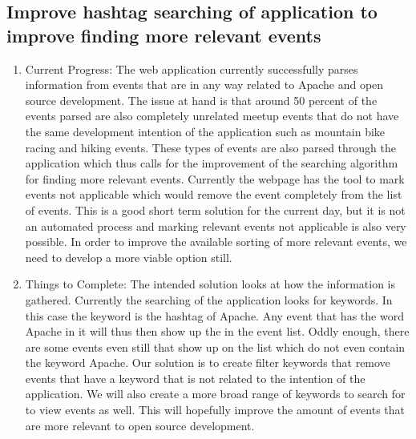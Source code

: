 \documentclass[letterpaper,10pt,onecolumn]{IEEEtran} %
\begin{document}
\subsection{Improve hashtag searching of application to improve finding more relevant events}
\begin{enumerate}[label*=\arabic*.]
\item Current Progress: The web application currently successfully parses information from events that are in any way related to Apache and open source development. The issue at hand is that around 50 percent of the events parsed are also completely unrelated meetup events that do not have the same development intention of the application such as mountain bike racing and hiking events. These types of events are also parsed through the application which thus calls for the improvement of the searching algorithm for finding more relevant events. Currently the webpage has the tool to mark events not applicable which would remove the event completely from the list of events. This is a good short term solution for the current day, but it is not an automated process and marking relevant events not applicable is also very possible. In order to improve the available sorting of more relevant events, we need to develop a more viable option still.

\item Things to Complete: The intended solution looks at how the information is gathered. Currently the searching of the application looks for keywords. In this case the keyword is the hashtag of Apache. Any event that has the word Apache in it will thus then show up the in the event list. Oddly enough, there are some events even still that show up on the list which do not even contain the keyword Apache. Our solution is to create filter keywords that remove events that have a keyword that is not related to the intention of the application. We will also create a more broad range of keywords to search for to view events as well. This will hopefully improve the amount of events that are more relevant to open source development.
\end{enumerate}
\end{document}
